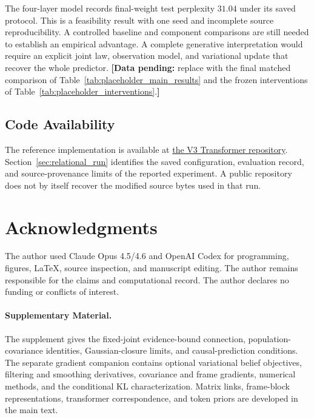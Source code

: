 \documentclass[twoside,11pt]{article}
\providecommand{\datapending}[1]{{\color{red!60!black}\textbf{[Data pending:} #1\textbf{]}}}
\begin{document}
The four-layer model records final-weight test perplexity $31.04$ under its saved protocol. This is a feasibility result with one seed and incomplete source reproducibility. A controlled baseline and component comparisons are still needed to establish an empirical advantage. A complete generative interpretation would require an explicit joint law, observation model, and variational update that recover the whole predictor.
\datapending{replace with the final matched comparison of Table~\ref{tab:placeholder_main_results} and the frozen interventions of Table~\ref{tab:placeholder_interventions}.} %

\subsection{Code Availability}
The reference implementation is available at \href{https://github.com/cdenn016/V3_Transformer}{the V3 Transformer repository}. Section~\ref{sec:relational_run} identifies the saved configuration, evaluation record, and source-provenance limits of the reported experiment. A public repository does not by itself recover the modified source bytes used in that run.

\section*{Acknowledgments}
The author used Claude Opus 4.5/4.6 and OpenAI Codex for programming, figures, LaTeX, source inspection, and manuscript editing. The author remains responsible for the claims and computational record. The author declares no funding or conflicts of interest.


\paragraph{Supplementary Material.}
The supplement gives the fixed-joint evidence-bound connection, population-covariance identities, Gaussian-closure limits, and causal-prediction conditions. The separate gradient companion contains optional variational belief objectives, filtering and smoothing derivatives, covariance and frame gradients, numerical methods, and the conditional KL characterization. Matrix links, frame-block representations, transformer correspondence, and token priors are developed in the main text.


\end{document}

